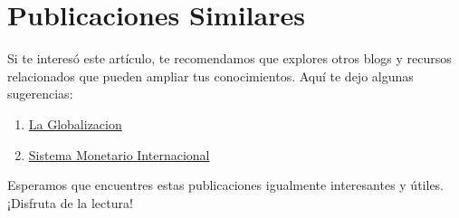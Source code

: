\documentclass[
  jou,
  floatsintext,
  longtable,
  a4paper,
  nolmodern,
  notxfonts,
  notimes,
  12pt,
  colorlinks=true,linkcolor=blue,citecolor=blue,urlcolor=blue]{apa7}
\providecommand{\tightlist}{%
  \setlength{\itemsep}{0pt}\setlength{\parskip}{0pt}}
\begin{document}
\section{Publicaciones Similares}\label{publicaciones-similares}

Si te interesó este artículo, te recomendamos que explores otros blogs y
recursos relacionados que pueden ampliar tus conocimientos. Aquí te dejo
algunas sugerencias:

\begin{enumerate}
\def\labelenumi{\arabic{enumi}.}
\tightlist
\item
  \href{https://pecunia-fluxus.netlify.app/finanzas-internacionales/2023-06-16-la-globalizacion/index.pdf}{}
  \href{https://pecunia-fluxus.netlify.app/finanzas-internacionales/2023-06-16-la-globalizacion}{La
  Globalizacion}
\item
  \href{https://pecunia-fluxus.netlify.app/finanzas-internacionales/2023-06-17-sistema-monetario-internacional/index.pdf}{}
  \href{https://pecunia-fluxus.netlify.app/finanzas-internacionales/2023-06-17-sistema-monetario-internacional}{Sistema
  Monetario Internacional}
\end{enumerate}

Esperamos que encuentres estas publicaciones igualmente interesantes y
útiles. ¡Disfruta de la lectura!
\end{document}
